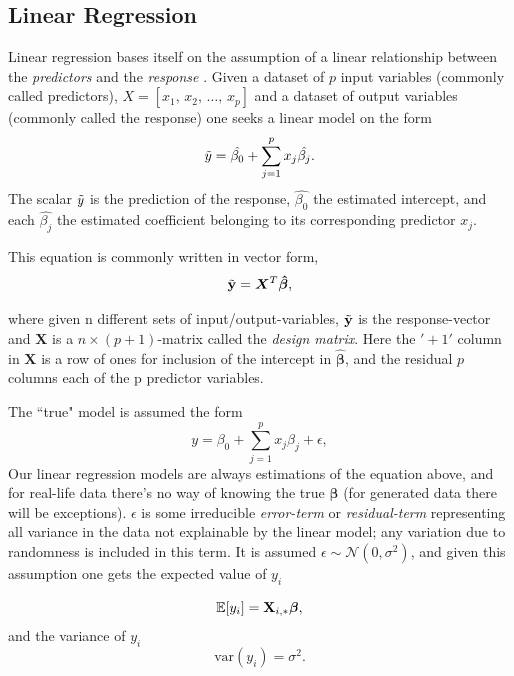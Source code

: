 \subsection{Linear Regression}
Linear regression bases itself on the assumption of a linear relationship between the \textit{predictors} and the \textit{response} \cite[p.21-26]{fahrmeir}. 
Given a dataset of $p$ input variables (commonly called predictors), $X=[x_1, \, x_2, \, \ldots, \, x_p]$ and a dataset of output variables (commonly called the response) one seeks a linear model on the form
\begin{equation}
\Tilde{y}=\hat{\beta_0}+\sum_{j=1}^{p}x_j\hat{\beta_j}.
\end{equation}
The scalar $\Tilde{y}$ is the prediction of the response, $\hat{\beta_0}$ the estimated intercept, and each $\hat{\beta_j}$ the estimated coefficient belonging to its corresponding predictor $x_j$. 

This equation is commonly written in vector form, 
\begin{equation}
\Tilde{\mathbf{y}}=\boldsymbol{X}^T\boldsymbol{\hat{\beta}},
\end{equation}

where given n different sets of input/output-variables, $\Tilde{\mathbf{y}}$ is the response-vector and $\boldsymbol{X}$ is a $n\times (p+1)$-matrix called the \textit{design matrix}\label{design-matrix}. Here the $'+1'$ column in $\boldsymbol{X}$ is a row of ones for inclusion of the intercept in $\boldsymbol{\hat{\beta}}$, and the residual $p$ columns each of the p predictor variables. 


The ``true" model is assumed the form 
\begin{equation}\label{OG_y}
y=\beta_0+\sum_{j=1}^{p}x_j\beta_j+\epsilon,
\end{equation}
Our linear regression models are always estimations of the equation above, and for real-life data there's no way of knowing the true $\boldsymbol{\beta}$ (for generated data there will be exceptions). 
$\epsilon$ is some irreducible \textit{error-term} or \textit{residual-term} representing all variance in the data not explainable by the linear model; any variation due to randomness is included in this term. It is assumed $\epsilon \sim  
\mathcal{N}(0,\sigma^2)$, and given this assumption one gets the expected value of $y_i$

\begin{equation}\label{expected_y}
    \mathbb{E}[y_i] = \mathbf{X}_{i,*}\boldsymbol{\beta},
\end{equation}
and the variance of $y_i$
\begin{equation}\label{var_y}
    \text{var}(y_i) = \sigma^2.
\end{equation}



